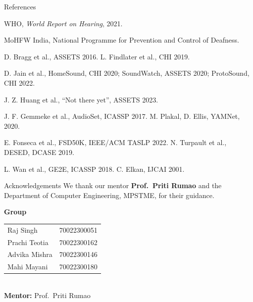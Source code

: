 \documentclass{article}
\begin{document}
\begin{minipage}[t]{0.49\linewidth}
\begin{psec}{References}
{\fontsize{15}{18}\selectfont
\begin{enumerate}[leftmargin=8mm, itemsep=1pt, label={[\arabic*]}]
\item WHO, \textit{World Report on Hearing}, 2021.
\item MoHFW India, National Programme for Prevention and Control of Deafness.
\item D. Bragg et al., ASSETS 2016. \quad L. Findlater et al., CHI 2019.
\item D. Jain et al., HomeSound, CHI 2020; SoundWatch, ASSETS 2020; ProtoSound, CHI 2022.
\item J. Z. Huang et al., ``Not there yet'', ASSETS 2023.
\item J. F. Gemmeke et al., AudioSet, ICASSP 2017. \quad M. Plakal, D. Ellis, YAMNet, 2020.
\item E. Fonseca et al., FSD50K, IEEE/ACM TASLP 2022. \quad N. Turpault et al., DESED, DCASE 2019.
\item L. Wan et al., GE2E, ICASSP 2018. \quad C. Elkan, IJCAI 2001.
\end{enumerate}}
\end{psec}

\begin{psec}{Acknowledgements}
We thank our mentor \textbf{Prof.\ Priti Rumao} and the Department of Computer Engineering, MPSTME, for their guidance.
\end{psec}

\begin{tcolorbox}[colback=nmlight, colframe=nm, boxrule=1.2pt, arc=2mm, left=5mm, right=5mm]
{\fontsize{22}{27}\selectfont\bfseries\rmfamily\color{nm} Group}\\[1mm]
{\fontsize{18}{23}\selectfont
\begin{tabular}{@{}ll@{}}
Raj Singh & 70022300051 \\
Prachi Teotia & 70022300162 \\
Advika Mishra & 70022300146 \\
Mahi Mayani & 70022300180 \\
\end{tabular}\\[2mm]
\textbf{Mentor:} Prof.\ Priti Rumao}
\end{tcolorbox}
\end{minipage}
\end{document}
